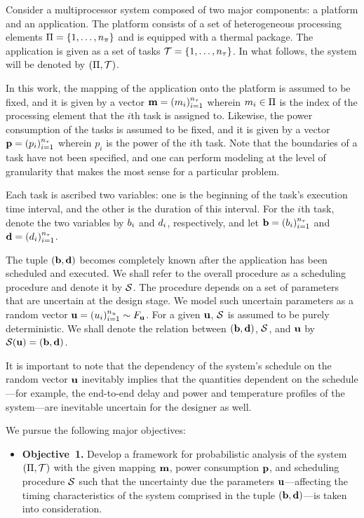 Consider a multiprocessor system composed of two major components: a platform
and an application. The platform consists of a set of heterogeneous processing
elements $\Pi = \{ 1, \dots, {n_\pi} \}$ and is equipped with a thermal package.
The application is given as a set of tasks $\mathcal{T} = \{ 1, \dots, {n_\tau} \}$. In
what follows, the system will be denoted by $(\Pi, \mathcal{T})$.

In this work, the mapping of the application onto the platform is assumed to be
fixed, and it is given by a vector $\mathbf{m} = (m_i)_{i = 1}^{{n_\tau}}$ wherein $m_i
\in \Pi$ is the index of the processing element that the $i$th task is
assigned to. Likewise, the power consumption of the tasks is assumed to be
fixed, and it is given by a vector $\mathbf{p} = (p_i)_{i = 1}^{{n_\tau}}$ wherein $p_i$
is the power of the $i$th task. Note that the boundaries of a task have not been
specified, and one can perform modeling at the level of granularity that makes
the most sense for a particular problem.

Each task is ascribed two variables: one is the beginning of the task's
execution time interval, and the other is the duration of this interval. For the
$i$th task, denote the two variables by $b_i$ and $d_i$, respectively, and let
$\mathbf{b} = (b_i)_{i=1}^{{n_\tau}}$ and $\mathbf{d} = (d_i)_{i=1}^{{n_\tau}}$.

The tuple $(\mathbf{b}, \mathbf{d})$ becomes completely known after the application has been
scheduled and executed. We shall refer to the overall procedure as a scheduling
procedure and denote it by $\mathcal{S}$. The procedure depends on a set of
parameters that are uncertain at the design stage. We model such uncertain
parameters as a random vector $\mathbf{u} = (u_i)_{i = 1}^{n_u} \sim F_{\mathbf{u}}$.
For a given $\mathbf{u}$, $\mathcal{S}$ is assumed to be purely deterministic. We shall
denote the relation between $(\mathbf{b}, \mathbf{d})$, $\mathcal{S}$, and $\mathbf{u}$ by
$\mathcal{S}(\mathbf{u}) = (\mathbf{b}, \mathbf{d})$.

It is important to note that the dependency of the system's schedule on the
random vector $\mathbf{u}$ inevitably implies that the quantities dependent on the
schedule---for example, the end-to-end delay and power and temperature profiles
of the system---are inevitable uncertain for the designer as well.

We pursue the following major objectives:
\begin{itemize}

\item \textbf{Objective~1.} Develop a framework for probabilistic analysis of
  the system $(\Pi, \mathcal{T})$ with the given mapping $\mathbf{m}$, power
  consumption $\mathbf{p}$, and scheduling procedure $\mathcal{S}$ such that the
  uncertainty due the parameters $\mathbf{u}$---affecting the timing characteristics of
  the system comprised in the tuple $(\mathbf{b}, \mathbf{d})$---is taken into consideration.

\end{itemize}
